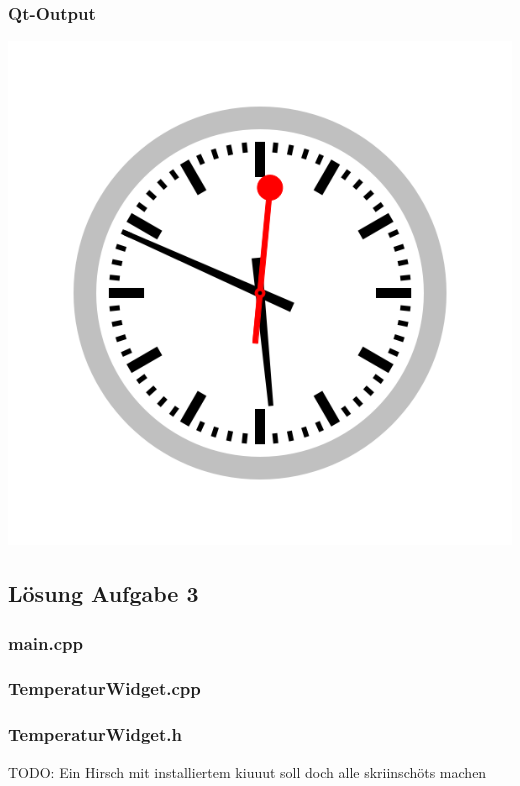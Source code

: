 \subsubsection{Qt-Output}
\begin{center}
	\includegraphics[scale=.5]{./images/u14a2.png}
\end{center}

\subsection{Lösung Aufgabe 3}
\subsubsection{main.cpp}

\subsubsection{TemperaturWidget.cpp}

\subsubsection{TemperaturWidget.h}



TODO: Ein Hirsch mit installiertem kiuuut soll doch alle skriinschöts machen

